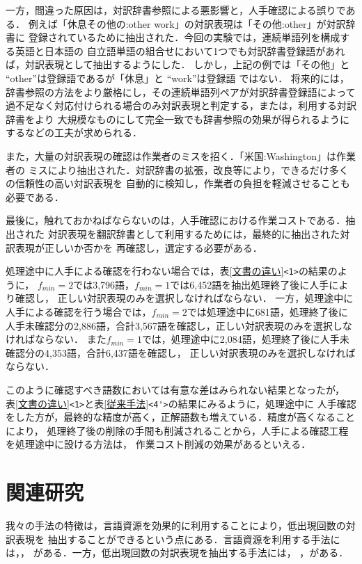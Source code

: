 一方，間違った原因は，対訳辞書参照による悪影響と，人手確認による誤りである．
例えば「休息その他の:other work」の対訳表現は「その他:other」が対訳辞書に
登録されているために抽出された．今回の実験では，連続単語列を構成する英語と日本語の
自立語単語の組合せにおいて1つでも対訳辞書登録語があれば，対訳表現として抽出するようにした．
しかし，上記の例では「その他」と ``other''は登録語であるが「休息」と ``work''は登録語
ではない．
将来的には，辞書参照の方法をより厳格にし，その連続単語列ペアが対訳辞書登録語によって
過不足なく対応付けられる場合のみ対訳表現と判定する，または，利用する対訳辞書をより
大規模なものにして完全一致でも辞書参照の効果が得られるようにするなどの工夫が求められる．

また，大量の対訳表現の確認は作業者のミスを招く．「米国:Washington」は作業者の
ミスにより抽出された．対訳辞書の拡張，改良等により，できるだけ多くの信頼性の高い対訳表現を
自動的に検知し，作業者の負担を軽減させることも必要である．

最後に，触れておかねばならないのは，人手確認における作業コストである．抽出された
対訳表現を翻訳辞書として利用するためには，最終的に抽出された対訳表現が正しいか否かを
再確認し，選定する必要がある．

処理途中に人手による確認を行わない場合では，表\ref{文書の違い}\verb|<1>|の結果のように，
$f_{min}=2$では3,796語，$f_{min}=1$では6,452語を抽出処理終了後に人手により確認し，
正しい対訳表現のみを選択しなければならない．
一方，処理途中に人手による確認を行う場合では，$f_{min}=2$では処理途中に681語，処理終了後に
人手未確認分の2,886語，合計3,567語を確認し，正しい対訳表現のみを選択しなければならない．
また$f_{min}=1$では，処理途中に2,084語，処理終了後に人手未確認分の4,353語，合計6,437語を確認し，
正しい対訳表現のみを選択しなければならない．

このように確認すべき語数においては有意な差はみられない結果となったが，
表\ref{文書の違い}\verb|<1>|と表\ref{従来手法}\verb|<4'>|の結果にみるように，処理途中に
人手確認をした方が，最終的な精度が高く，正解語数も増えている．精度が高くなることにより，
処理終了後の削除の手間も削減されることから，人手による確認工程を処理途中に設ける方法は，
作業コスト削減の効果があるといえる．

\section{関連研究}
\label{関連研究}

我々の手法の特徴は，言語資源を効果的に利用することにより，低出現回数の対訳表現を
抽出することができるという点にある．言語資源を利用する手法には，\cite{Melamed:1995}，
\cite{Al-Onaizan-Kevin:2002} がある．一方，低出現回数の対訳表現を抽出する手法には，
\cite{Moore:2003}，\cite{佐藤2002,佐藤2003}がある．

